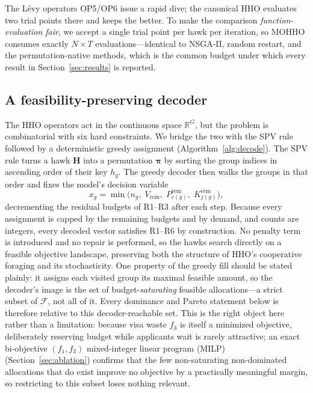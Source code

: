 \documentclass[runningheads]{llncs}
\begin{document}
The Lévy operators OP5/OP6 issue a rapid dive; the canonical HHO evaluates two trial points there and keeps the better. To make the comparison \emph{function-evaluation fair}, we accept a single trial point per hawk per iteration, so MOHHO consumes exactly $N\times T$ evaluations---identical to NSGA-II, random restart, and the permutation-native methods, which is the common budget under which every result in Section~\ref{sec:results} is reported.

\subsection{A feasibility-preserving decoder}
\label{sec:decoder}

The HHO operators act in the continuous space $\mathbb{R}^{G}$, but the problem is combinatorial with six hard constraints. We bridge the two with the SPV rule~\cite{bean} followed by a deterministic greedy assignment (Algorithm~\ref{alg:decode}). The SPV rule turns a hawk $\mathbf{H}$ into a permutation $\boldsymbol{\pi}$ by sorting the group indices in ascending order of their key $h_g$. The greedy decoder then walks the groups in that order and fixes the model's decision variable
\begin{equation}
x_g = \min\!\bigl(n_g,\; V_{\text{rem}},\; P^{\text{rem}}_{c(g)},\; K^{\text{rem}}_{j(g)}\bigr),
\label{eq:greedy}
\end{equation}
decrementing the residual budgets of R1--R3 after each step. Because every assignment is capped by the remaining budgets and by demand, and counts are integers, every decoded vector satisfies R1--R6 by construction. No penalty term is introduced and no repair is performed, so the hawks search directly on a feasible objective landscape, preserving both the structure of HHO's cooperative foraging and its stochasticity. One property of the greedy fill should be stated plainly: it assigns each visited group its maximal feasible amount, so the decoder's image is the set of budget-\emph{saturating} feasible allocations---a strict subset of $\mathcal{F}$, not all of it. Every dominance and Pareto statement below is therefore relative to this decoder-reachable set. This is the right object here rather than a limitation: because visa waste $f_3$ is itself a minimized objective, deliberately reserving budget while applicants wait is rarely attractive; an exact bi-objective $(f_1,f_3)$ mixed-integer linear program (MILP) (Section~\ref{sec:ablation}) confirms that the few non-saturating non-dominated allocations that do exist improve no objective by a practically meaningful margin, so restricting to this subset loses nothing relevant.
\end{document}
